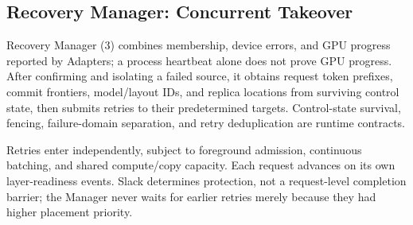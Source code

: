 \subsection{Recovery Manager: Concurrent Takeover}
\label{sec:parallel-recovery}

Recovery Manager (3) combines membership, device errors, and GPU progress
reported by Adapters; a process heartbeat alone does not prove GPU
progress. After confirming and isolating a failed source, it obtains
request token prefixes, commit frontiers, model/layout IDs, and replica
locations from surviving control state, then submits retries to their
predetermined targets. Control-state survival, fencing, failure-domain
separation, and retry deduplication are runtime contracts.

Retries enter independently, subject to foreground admission, continuous
batching, and shared compute/copy capacity. Each request advances on its
own layer-readiness events. Slack determines protection, not a request-level
completion barrier; the Manager never waits for earlier retries merely
because they had higher placement priority.
